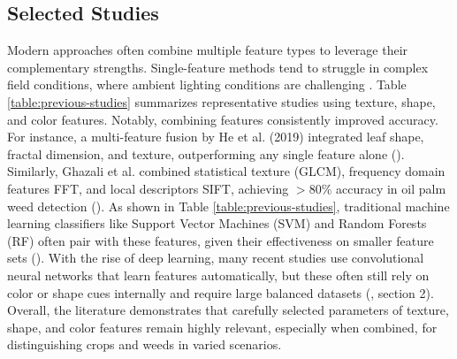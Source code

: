 \documentclass[letterpaper, notitlepage]{report}
\begin{document}
\subsection{Selected Studies}
Modern approaches often combine multiple feature types to leverage their complementary strengths. Single-feature methods tend to struggle in complex field conditions, where ambient lighting conditions are challenging \parencite{Wu2021-gt}. Table \ref{table:previous-studies} summarizes representative studies using texture, shape, and color features. Notably, combining features consistently improved accuracy. For instance, a multi-feature fusion by He et al. (2019) integrated leaf shape, fractal dimension, and texture, outperforming any single feature alone (\cite{Wu2021-gt}). Similarly, Ghazali et al. combined statistical texture (GLCM), frequency domain features \gls{FFT}, and local descriptors \gls{SIFT}, achieving $>$80\% accuracy in oil palm weed detection (\cite{Wu2021-gt}). As shown in Table \ref{table:previous-studies}, traditional machine learning classifiers like Support Vector Machines (SVM) and Random Forests (RF) often pair with these features, given their effectiveness on smaller feature sets (\cite{Wu2021-gt}). With the rise of deep learning, many recent studies use convolutional neural networks that learn features automatically, but these often still rely on color or shape cues internally and require large balanced datasets  (\cite{Wu2021-gt}, section 2). Overall, the literature demonstrates that carefully selected parameters of texture, shape, and color features remain highly relevant, especially when combined, for distinguishing crops and weeds in varied scenarios.
\end{document}

